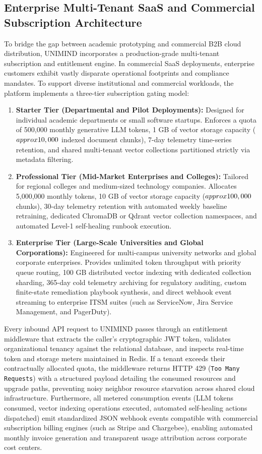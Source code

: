 \documentclass[12pt,onecolumn,draftclsnofoot]{IEEEtran}
\begin{document}
\subsection{Enterprise Multi-Tenant SaaS and Commercial Subscription Architecture}
To bridge the gap between academic prototyping and commercial B2B cloud distribution, UNIMIND incorporates a production-grade multi-tenant subscription and entitlement engine. In commercial SaaS deployments, enterprise customers exhibit vastly disparate operational footprints and compliance mandates. To support diverse institutional and commercial workloads, the platform implements a three-tier subscription gating model:
\begin{enumerate}
    \item \textbf{Starter Tier (Departmental and Pilot Deployments):} Designed for individual academic departments or small software startups. Enforces a quota of 500,000 monthly generative LLM tokens, 1 GB of vector storage capacity ($\\approx 10,000$ indexed document chunks), 7-day telemetry time-series retention, and shared multi-tenant vector collections partitioned strictly via metadata filtering.
    \item \textbf{Professional Tier (Mid-Market Enterprises and Colleges):} Tailored for regional colleges and medium-sized technology companies. Allocates 5,000,000 monthly tokens, 10 GB of vector storage capacity ($\\approx 100,000$ chunks), 30-day telemetry retention with automated weekly baseline retraining, dedicated ChromaDB or Qdrant vector collection namespaces, and automated Level-1 self-healing runbook execution.
    \item \textbf{Enterprise Tier (Large-Scale Universities and Global Corporations):} Engineered for multi-campus university networks and global corporate enterprises. Provides unlimited token throughput with priority queue routing, 100 GB distributed vector indexing with dedicated collection sharding, 365-day cold telemetry archiving for regulatory auditing, custom finite-state remediation playbook synthesis, and direct webhook event streaming to enterprise ITSM suites (such as ServiceNow, Jira Service Management, and PagerDuty).
\end{enumerate}

Every inbound API request to UNIMIND passes through an entitlement middleware that extracts the caller's cryptographic JWT token, validates organizational tenancy against the relational database, and inspects real-time token and storage meters maintained in Redis. If a tenant exceeds their contractually allocated quota, the middleware returns HTTP 429 (\texttt{Too Many Requests}) with a structured payload detailing the consumed resources and upgrade paths, preventing noisy neighbor resource starvation across shared cloud infrastructure. Furthermore, all metered consumption events (LLM tokens consumed, vector indexing operations executed, automated self-healing actions dispatched) emit standardized JSON webhook events compatible with commercial subscription billing engines (such as Stripe and Chargebee), enabling automated monthly invoice generation and transparent usage attribution across corporate cost centers.
\end{document}
